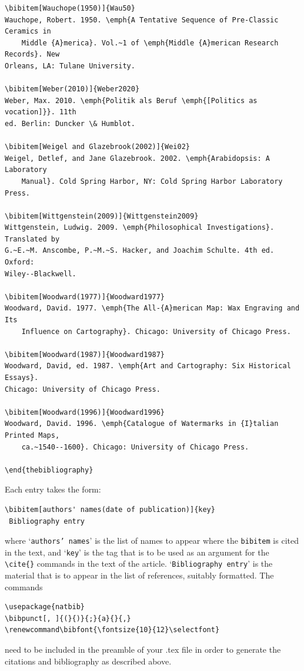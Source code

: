 \documentclass[]{interact}
\renewcommand\bibfont{\fontsize{10}{12}\selectfont}%
\theoremstyle{plain}%
\theoremstyle{definition}
\theoremstyle{remark}
\begin{document}
\begin{verbatim}
\bibitem[Wauchope(1950)]{Wau50}
Wauchope, Robert. 1950. \emph{A Tentative Sequence of Pre-Classic Ceramics in
	Middle {A}merica}. Vol.~1 of \emph{Middle {A}merican Research Records}. New
Orleans, LA: Tulane University.

\bibitem[Weber(2010)]{Weber2020}
Weber, Max. 2010. \emph{Politik als Beruf \emph{[Politics as vocation]}}. 11th
ed. Berlin: Duncker \& Humblot.

\bibitem[Weigel and Glazebrook(2002)]{Wei02}
Weigel, Detlef, and Jane Glazebrook. 2002. \emph{Arabidopsis: A Laboratory
	Manual}. Cold Spring Harbor, NY: Cold Spring Harbor Laboratory Press.

\bibitem[Wittgenstein(2009)]{Wittgenstein2009}
Wittgenstein, Ludwig. 2009. \emph{Philosophical Investigations}. Translated by
G.~E.~M. Anscombe, P.~M.~S. Hacker, and Joachim Schulte. 4th ed. Oxford:
Wiley--Blackwell.

\bibitem[Woodward(1977)]{Woodward1977}
Woodward, David. 1977. \emph{The All-{A}merican Map: Wax Engraving and Its
	Influence on Cartography}. Chicago: University of Chicago Press.

\bibitem[Woodward(1987)]{Woodward1987}
Woodward, David, ed. 1987. \emph{Art and Cartography: Six Historical Essays}.
Chicago: University of Chicago Press.

\bibitem[Woodward(1996)]{Woodward1996}
Woodward, David. 1996. \emph{Catalogue of Watermarks in {I}talian Printed Maps,
	ca.~1540--1600}. Chicago: University of Chicago Press.

\end{thebibliography}
\end{verbatim}
\bigskip
\noindent Each entry takes the form:
\begin{verbatim}
\bibitem[authors' names(date of publication)]{key}
 Bibliography entry
\end{verbatim}
where `\texttt{authors' names}' is the list of names to appear where the \verb"bibitem" is cited in the text, and `\texttt{key}' is the tag that is to be used as an argument for the \verb"\cite{}" commands in the text of the article. `\texttt{Bibliography entry}' is the material that is to appear in the list of references, suitably formatted. The commands
\begin{verbatim}
\usepackage{natbib}
\bibpunct[, ]{(}{)}{;}{a}{}{,}
\renewcommand\bibfont{\fontsize{10}{12}\selectfont}
\end{verbatim}
need to be included in the preamble of your .tex file in order to generate the citations and bibliography as described above.
\end{document}
